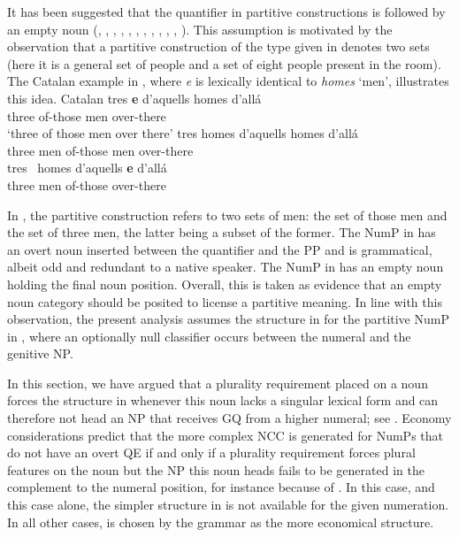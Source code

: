 \documentclass[output=paper,
modfonts,
newtxmath,
hidelinks
]{langscibook}
\begin{document}
It has been suggested that the quantifier in partitive constructions is followed by an empty noun (\citealt{Milner1978}, \citealt{Bonet1986}, \citealt{Abney1987}, \citealt{Hernanz-Brucart1987}, \citealt{Delsing1988, Delsing1993}, \citealt{Ramos1992}, \citealt{Cardinaletti-Giusti1992, Cardinaletti-Giusti2006}, \citealt{Sleeman1996}, \citealt{Doetjes1997}, \citealt{Barker1998}, \citealt{Brucart-Rigau2002}, \citealt{Ionin-etal2006}). This assumption is motivated by the observation that a partitive construction of the type given in  denotes two sets (here it is a general set of people and a set of eight people present in the room). The Catalan example in , where \textit{e} is lexically identical to \textit{homes} ‘men’, illustrates this idea. 
\ea Catalan \citep[27]{MartiiGirbau2010} \label{18:ex26}
	\ea \label{18:ex26a}
		\gll tres  \textbf{e}  d’aquells  homes     d’allá\\
			 three {} of-those men over-there\\
		\glt `three of those men over there'
	\ex \label{18:ex26b}
		\gll tres homes d’aquells homes d’allá\\
			 three men of-those men over-there\\
    \ex \label{18:ex26c}
		\gll tres~   homes   d’aquells   \textbf{e}   d’allá~ ~\\
			 three men of-those { } over-there\\
	\z
\z

\noindent In , the partitive construction refers to two sets of men: the set of those men and the set of three men, the latter being a subset of the former. The NumP in  has an overt noun inserted between the quantifier and the PP and is grammatical, albeit odd and redundant to a native speaker. The NumP in  has an empty noun holding the final noun position. Overall, this is taken as evidence that an empty noun category should be posited to license a partitive meaning. In line with this observation, the present analysis assumes the structure in  for the partitive NumP in , where an optionally null classifier occurs between the numeral and the genitive NP. 

In this section, we have argued that a plurality requirement placed on a noun forces the structure in  whenever this noun lacks a singular lexical form and can therefore not head an NP that receives GQ from a higher numeral; see . Economy considerations predict that the more complex NCC is generated for NumPs that do not have an overt QE if and only if a plurality requirement forces plural features on the noun but the NP this noun heads fails to be generated in the complement to the numeral position, for instance because of . In this case, and this case alone, the simpler structure in  is not available for the given numeration. In all other cases,  is chosen by the grammar as the more economical structure.
\end{document}
